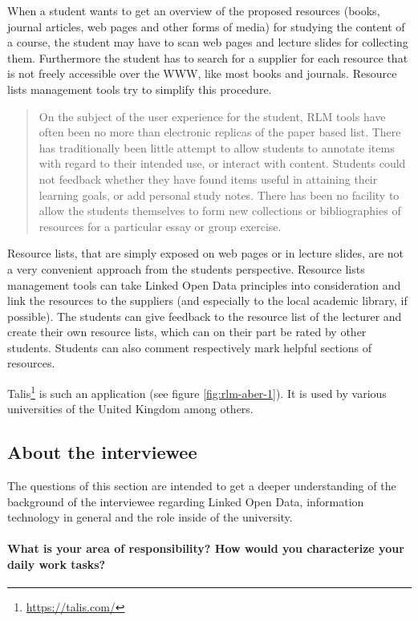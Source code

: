 \documentclass{article}
\begin{document}
When a student wants to get an overview of the proposed resources (books, journal articles, web pages and other forms of media) for studying the content of a course, the student may have to scan web pages and lecture slides for collecting them. Furthermore the student has to search for a supplier for each resource that is not freely accessible over the WWW, like most books and journals. Resource lists management tools try to simplify this procedure. \begin{quote}On the subject of the user experience for the student, RLM tools have often been no more than electronic replicas of the paper based list. There has traditionally been little attempt to allow students to annotate items with regard to their intended use, or interact with content. Students could not feedback whether they have found items useful in attaining their learning goals, or add personal study notes. There has been no facility to allow the students themselves to form new collections or bibliographies of resources for a particular essay or group exercise.\cite{clarke_resource_2009}\end{quote} Resource lists, that are simply exposed on web pages or in lecture slides, are not a very convenient approach from the students perspective. Resource lists management tools can take Linked Open Data principles into consideration and link the resources to the suppliers (and especially to the local academic library, if possible). The students can give feedback to the resource list of the lecturer and create their own resource lists, which can on their part be rated by other students. Students can also comment respectively mark helpful sections of resources.

Talis\footnote{\url{https://talis.com/}} is such an application (see figure \ref{fig:rlm-aber-1}). It is used by various universities of the United Kingdom among others.

\subsection{About the interviewee}
\label{questionaire:about-interviewee}
The questions of this section are intended to get a deeper understanding of the background of the interviewee regarding Linked Open Data, information technology in general and the role inside of the university.
\vspace*{0.15cm}
\paragraph{What is your area of responsibility? How would you characterize your daily work tasks?}
\end{document}
